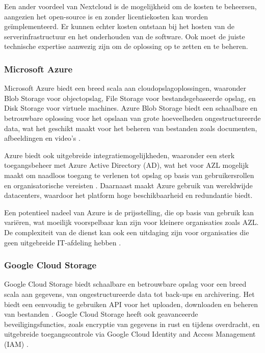 Een ander voordeel van Nextcloud is de mogelijkheid om de kosten te beheersen, aangezien het open-source is en zonder licentiekosten kan worden geïmplementeerd. Er kunnen echter kosten ontstaan bij het hosten van de serverinfrastructuur en het onderhouden van de software. Ook moet de juiste technische expertise aanwezig zijn om de oplossing op te zetten en te beheren.

\subsubsection{Microsoft Azure}
Microsoft Azure biedt een breed scala aan cloudopslagoplossingen, waaronder Blob Storage voor objectopslag, File Storage voor bestandsgebaseerde opslag, en Disk Storage voor virtuele machines. Azure Blob Storage biedt een schaalbare en betrouwbare oplossing voor het opslaan van grote hoeveelheden ongestructureerde data, wat het geschikt maakt voor het beheren van bestanden zoals documenten, afbeeldingen en video's \autocite{azure_blob}.

Azure biedt ook uitgebreide integratiemogelijkheden, waaronder een sterk toegangsbeheer met Azure Active Directory (AD), wat het voor AZL mogelijk maakt om naadloos toegang te verlenen tot opslag op basis van gebruikersrollen en organisatorische vereisten \autocite{azure_ad}. Daarnaast maakt Azure gebruik van wereldwijde datacenters, waardoor het platform hoge beschikbaarheid en redundantie biedt.

Een potentieel nadeel van Azure is de prijsstelling, die op basis van gebruik kan variëren, wat moeilijk voorspelbaar kan zijn voor kleinere organisaties zoals AZL. De complexiteit van de dienst kan ook een uitdaging zijn voor organisaties die geen uitgebreide IT-afdeling hebben \autocite{azure_pricing}.

\subsubsection{Google Cloud Storage}
Google Cloud Storage biedt schaalbare en betrouwbare opslag voor een breed scala aan gegevens, van ongestructureerde data tot back-ups en archivering. Het biedt een eenvoudig te gebruiken API voor het uploaden, downloaden en beheren van bestanden \autocite{google_storage}. Google Cloud Storage heeft ook geavanceerde beveiligingsfuncties, zoals encryptie van gegevens in rust en tijdens overdracht, en uitgebreide toegangscontrole via Google Cloud Identity and Access Management (IAM) \autocite{google_iam}.

